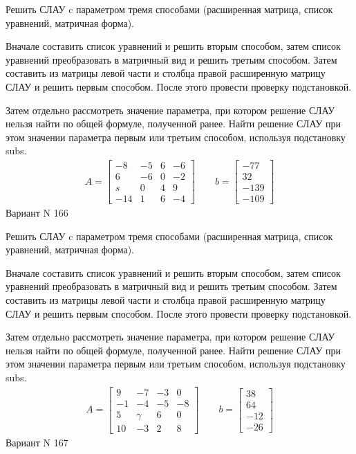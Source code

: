 \documentclass[11pt]{report}
\begin{document}
Решить СЛАУ c параметром тремя способами (расширенная матрица, список уравнений, матричная форма).

Вначале составить список уравнений и решить вторым способом,
затем список уравнений преобразовать в матричный вид и решить третьим способом.
Затем составить из матрицы левой части и столбца правой расширенную матрицу СЛАУ и решить первым способом.
После этого провести проверку подстановкой.

Затем отдельно рассмотреть значение параметра, при котором решение СЛАУ нельзя найти по общей формуле,
полученной ранее.
Найти решение СЛАУ при этом значении параметра первым или третьим способом, используя подстановку subs.
\begin{align*}
    A = \left[\begin{matrix}-8 & -5 & 6 & -6\\6 & -6 & 0 & -2\\s & 0 & 4 & 9\\-14 & 1 & 6 & -4\end{matrix}\right]
\qquad b = \left[\begin{matrix}-77\\32\\-139\\-109\end{matrix}\right]
\end{align*}
\newpage
Вариант N 166


Решить СЛАУ c параметром тремя способами (расширенная матрица, список уравнений, матричная форма).

Вначале составить список уравнений и решить вторым способом,
затем список уравнений преобразовать в матричный вид и решить третьим способом.
Затем составить из матрицы левой части и столбца правой расширенную матрицу СЛАУ и решить первым способом.
После этого провести проверку подстановкой.

Затем отдельно рассмотреть значение параметра, при котором решение СЛАУ нельзя найти по общей формуле,
полученной ранее.
Найти решение СЛАУ при этом значении параметра первым или третьим способом, используя подстановку subs.
\begin{align*}
    A = \left[\begin{matrix}9 & -7 & -3 & 0\\-1 & -4 & -5 & -8\\5 & \gamma & 6 & 0\\10 & -3 & 2 & 8\end{matrix}\right]
\qquad b = \left[\begin{matrix}38\\64\\-12\\-26\end{matrix}\right]
\end{align*}
\newpage
Вариант N 167
\end{document}
